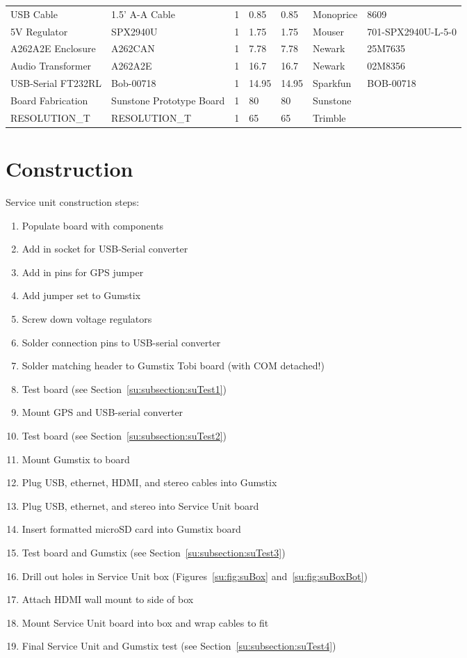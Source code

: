 \begin{landscape}
\begin{center}
\begin{longtable}{|p{2in}|p{1.5in}|p{.75in}|p{.5in}|p{.5in}|p{1in}|p{1.5in}|}
USB Cable & 1.5' A-A Cable & 1 & 0.85 & 0.85 & Monoprice & 8609\\ 
5V Regulator & SPX2940U & 1 & 1.75 & 1.75 & Mouser & 701-SPX2940U-L-5-0\\ 
A262A2E Enclosure & A262CAN & 1 & 7.78 & 7.78 & Newark & 25M7635\\ 
Audio Transformer & A262A2E & 1 & 16.7 & 16.7 & Newark & 02M8356\\ 
USB-Serial FT232RL & Bob-00718 & 1 & 14.95 & 14.95 & Sparkfun & BOB-00718\\ 
Board Fabrication & Sunstone Prototype Board & 1 & 80 & 80 & Sunstone & \\ 
RESOLUTION\_T & RESOLUTION\_T & 1 & 65 & 65 & Trimble & 
\end{longtable}
\end{center}
\end{landscape}

\section{Construction}

Service unit construction steps:

\begin{enumerate}
\item{Populate board with components}
\item{Add in socket for USB-Serial converter}
\item{Add in pins for GPS jumper}
\item{Add jumper set to Gumstix}
\item{Screw down voltage regulators}
\item{Solder connection pins to USB-serial converter}
\item{Solder matching header to Gumstix Tobi board (with COM detached!)}
\item{Test board (see Section~\ref{su:subsection:suTest1})}
\item{Mount GPS and USB-serial converter}
\item{Test board (see Section~\ref{su:subsection:suTest2})}
\item{Mount Gumstix to board}
\item{Plug USB, ethernet, HDMI, and stereo cables into Gumstix}
\item{Plug USB, ethernet, and stereo into Service Unit board}
\item{Insert formatted microSD card into Gumstix board}
\item{Test board and Gumstix (see Section~\ref{su:subsection:suTest3})}
\item{Drill out holes in Service Unit box (Figures~\ref{su:fig:suBox} and~\ref{su:fig:suBoxBot})}
\item{Attach HDMI wall mount to side of box}
\item{Mount Service Unit board into box and wrap cables to fit}
\item{Final Service Unit and Gumstix test (see Section~\ref{su:subsection:suTest4})}
\end{enumerate}

